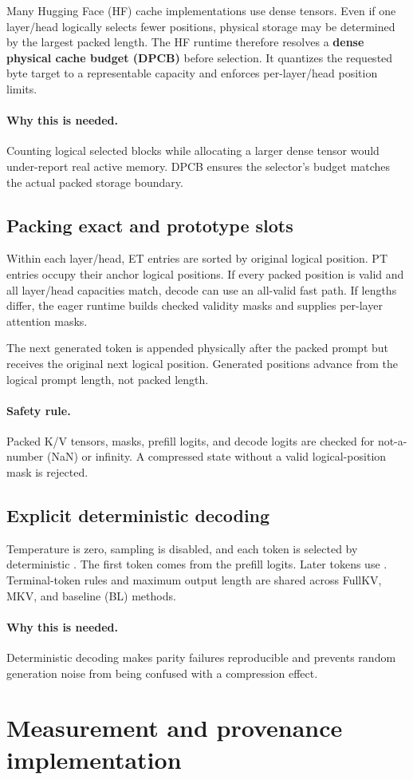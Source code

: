 \documentclass[11pt]{article}
\newcommand{\code}[1]{\texttt{\detokenize{#1}}}
\newcommand{\term}[1]{\textbf{#1}}
\newcommand{\why}{\paragraph{Why this is needed.}}
\newcommand{\safety}{\paragraph{Safety rule.}}
\begin{document}
Many Hugging Face (HF) cache implementations use dense tensors. Even if one layer/head logically
selects fewer positions, physical storage may be determined by the largest packed length. The HF
runtime therefore resolves a \term{dense physical cache budget (DPCB)} before selection. It
quantizes the requested byte target to a representable capacity and enforces per-layer/head
position limits.

\why Counting logical selected blocks while allocating a larger dense tensor would under-report
real active memory. DPCB ensures the selector's budget matches the actual packed storage boundary.

\subsection{Packing exact and prototype slots}

Within each layer/head, ET entries are sorted by original logical position. PT entries occupy
their anchor logical positions. If every packed position is valid and all layer/head capacities
match, decode can use an all-valid fast path. If lengths differ, the eager runtime builds checked
validity masks and supplies per-layer attention masks.

The next generated token is appended physically after the packed prompt but receives the original
next logical position. Generated positions advance from the logical prompt length, not packed
length.

\safety Packed K/V tensors, masks, prefill logits, and decode logits are checked for not-a-number
(NaN) or infinity. A compressed state without a valid logical-position mask is rejected.

\subsection{Explicit deterministic decoding}

Temperature is zero, sampling is disabled, and each token is selected by deterministic
\code{argmax}. The first token comes from the prefill logits. Later tokens use
\code{decode_one_token}. Terminal-token rules and maximum output length are shared across FullKV,
MKV, and baseline (BL) methods.

\why Deterministic decoding makes parity failures reproducible and prevents random generation
noise from being confused with a compression effect.

\section{Measurement and provenance implementation}
\label{sec:measurement}
\end{document}
